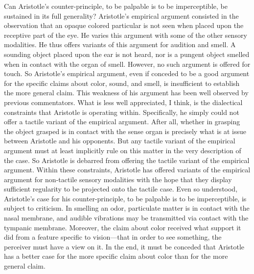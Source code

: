 Can Aristotle's counter-principle, to be palpable is to be imperceptible, be sustained in its full generality? Aristotle's empirical argument consisted in the observation that an opaque colored particular is not seen when placed upon the receptive part of the eye. He varies this argument with some of the other sensory modalities. He thus offers variants of this argument for audition and smell. A sounding object placed upon the ear is not heard, nor is a pungent object smelled when in contact with the organ of smell. However, no such argument is offered for touch. So Aristotle's empirical argument, even if conceded to be a good argument for the specific claims about color, sound, and smell, is insufficient to establish the more general claim. This weakness of his argument has been well observed by previous commentators. What is less well appreciated, I think, is the dialectical constraints that Aristotle is operating within. Specifically, he simply could not offer a tactile variant of the empirical argument. After all, whether in grasping the object grasped is in contact with the sense organ is precisely what is at issue between Aristotle and his opponents. But any tactile variant of the empirical  argument must at least implicitly rule on this matter in the very description of the case. So Aristotle is debarred from offering the tactile variant of the empirical argument. Within these constraints, Aristotle has offered variants of the empirical argument for non-tactile sensory modalities with the hope that they display sufficient regularity to be projected onto the tactile case. Even so understood, Aristotle's case for his counter-principle, to be palpable is to be imperceptible, is subject to criticism. In smelling an odor, particulate matter is in contact with the nasal membrane, and audible vibrations may be transmitted via contact with the tympanic membrane. Moreover, the claim about color received what support it did from a feature specific to vision---that in order to see something, the perceiver must have a view on it. In the end, it must be conceded that Aristotle has a better case for the more specific claim about color than for the more general claim.

